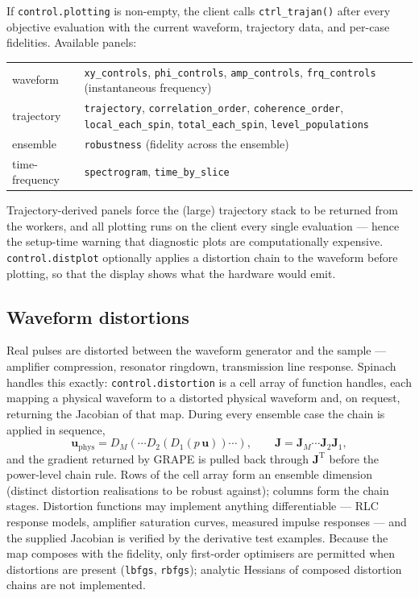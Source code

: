\documentclass[11pt,a4paper]{article}
\newcommand{\code}[1]{\texttt{#1}}
\begin{document}
If \code{control.plotting} is non-empty, the client calls
\code{ctrl\_trajan()} after every objective evaluation with the current
waveform, trajectory data, and per-case fidelities. Available panels:
\begin{center}
\begin{tabular}{lp{8.6cm}}
\toprule
waveform & \code{xy\_controls}, \code{phi\_controls},
           \code{amp\_controls}, \code{frq\_controls}
           (instantaneous frequency)\\
trajectory & \code{trajectory}, \code{correlation\_order},
             \code{coherence\_order}, \code{local\_each\_spin},
             \code{total\_each\_spin}, \code{level\_populations}\\
ensemble & \code{robustness} (fidelity across the ensemble)\\
time-frequency & \code{spectrogram}, \code{time\_by\_slice}\\
\bottomrule
\end{tabular}
\end{center} Trajectory-derived panels force the (large) trajectory stack to
be returned from the workers, and all plotting runs on the client every
single evaluation --- hence the setup-time warning that diagnostic plots
are computationally expensive. \code{control.distplot} optionally applies
a distortion chain to the waveform before plotting, so that the display
shows what the hardware would emit.

\subsection{Waveform distortions}
\label{sec:distortions}

Real pulses are distorted between the waveform generator and the sample
--- amplifier compression, resonator ringdown, transmission line
response. Spinach handles this exactly: \code{control.distortion} is a
cell array of function handles, each mapping a physical waveform to a
distorted physical waveform and, on request, returning the Jacobian of
that map. During every ensemble case the chain is applied in sequence,
\begin{equation}
  \mathbf{u}_{\mathrm{phys}}
  =D_M(\cdots D_2(D_1(p\,\mathbf{u}))\cdots),
  \qquad
  \mathbf{J}=\mathbf{J}_M\cdots\mathbf{J}_2\mathbf{J}_1,
\end{equation}
and the gradient returned by GRAPE is pulled back through
$\mathbf{J}^{\mathrm{T}}$ before the power-level chain rule. Rows of the
cell array form an ensemble dimension (distinct distortion realisations
to be robust against); columns form the chain stages. Distortion
functions may implement anything differentiable --- RLC response models,
amplifier saturation curves, measured impulse responses --- and the
supplied Jacobian is verified by the derivative test examples. Because
the map composes with the fidelity, only first-order optimisers are
permitted when distortions are present (\code{lbfgs}, \code{rbfgs});
analytic Hessians of composed distortion chains are not implemented.
\end{document}
